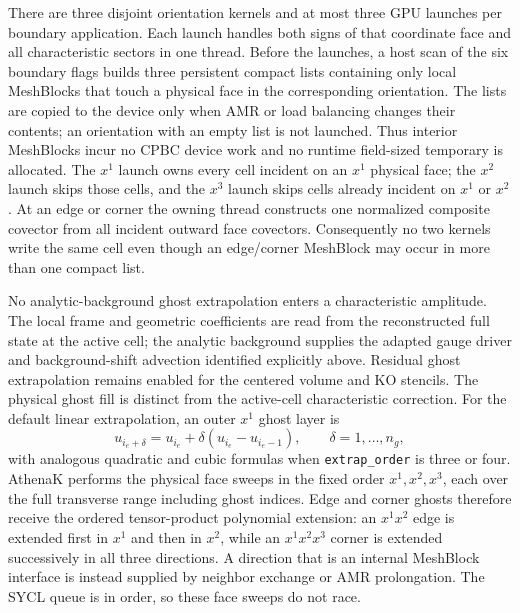 \documentclass[11pt]{article}
\begin{document}
There are three disjoint orientation kernels and at most three GPU launches
per boundary application.  Each launch handles both signs of that coordinate
face and all characteristic sectors in one thread.  Before the launches, a
host scan of the six boundary flags builds three persistent compact lists
containing only local MeshBlocks that touch a physical face in the
corresponding orientation.  The lists are copied to the device only when AMR
or load balancing changes their contents; an orientation with an empty list
is not launched.  Thus interior MeshBlocks incur no CPBC device work and no
runtime field-sized temporary is allocated.
The \(x^1\) launch owns every cell incident on an \(x^1\) physical face; the
\(x^2\) launch skips those cells, and the \(x^3\) launch skips cells already
incident on \(x^1\) or \(x^2\).  At an edge or corner the owning thread
constructs one normalized composite covector from all incident outward face
covectors.  Consequently no two kernels write the same cell even though an
edge/corner MeshBlock may occur in more than one compact list.

No analytic-background ghost extrapolation enters a characteristic
amplitude.  The local frame and geometric coefficients are read from the
reconstructed full state at the active cell; the analytic background supplies
the adapted gauge driver and background-shift advection identified explicitly
above.  Residual ghost extrapolation remains enabled for the centered volume
and KO stencils.
The physical ghost fill is distinct from the active-cell characteristic
correction.  For the default linear extrapolation, an outer \(x^1\) ghost
layer is
\[
 u_{i_e+\delta}=u_{i_e}
   +\delta\left(u_{i_e}-u_{i_e-1}\right),
 \qquad \delta=1,\ldots,n_g ,
\]
with analogous quadratic and cubic formulas when
\texttt{extrap\_order} is three or four.  AthenaK performs the physical
face sweeps in the fixed order \(x^1,x^2,x^3\), each over the full transverse
range including ghost indices.  Edge and corner ghosts therefore receive the
ordered tensor-product polynomial extension: an \(x^1x^2\) edge is extended
first in \(x^1\) and then in \(x^2\), while an \(x^1x^2x^3\) corner is
extended successively in all three directions.  A direction that is an
internal MeshBlock interface is instead supplied by neighbor exchange or AMR
prolongation.  The SYCL queue is in order, so these face sweeps do not race.
\end{document}
